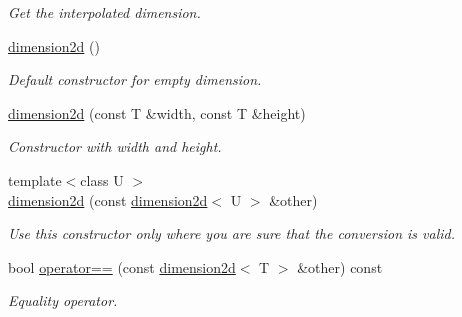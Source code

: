 \begin{DoxyCompactItemize}
\begin{DoxyCompactList}\small\item\em Get the interpolated dimension. \end{DoxyCompactList}\item 
\mbox{\label{classirr_1_1core_1_1dimension2d_ae0c2a30ce6283602c454901ef0bd6a04}} 
\hyperlink{classirr_1_1core_1_1dimension2d_ae0c2a30ce6283602c454901ef0bd6a04}{dimension2d} ()
\begin{DoxyCompactList}\small\item\em Default constructor for empty dimension. \end{DoxyCompactList}\item 
\mbox{\label{classirr_1_1core_1_1dimension2d_a9032aa6e975b32497ed3b570e3d03b76}} 
\hyperlink{classirr_1_1core_1_1dimension2d_a9032aa6e975b32497ed3b570e3d03b76}{dimension2d} (const T \&width, const T \&height)
\begin{DoxyCompactList}\small\item\em Constructor with width and height. \end{DoxyCompactList}\item 
\mbox{\label{classirr_1_1core_1_1dimension2d_a50814f5fc29d226104d5739350befb31}} 
{\footnotesize template$<$class U $>$ }\\\hyperlink{classirr_1_1core_1_1dimension2d_a50814f5fc29d226104d5739350befb31}{dimension2d} (const \hyperlink{classirr_1_1core_1_1dimension2d}{dimension2d}$<$ U $>$ \&other)
\begin{DoxyCompactList}\small\item\em Use this constructor only where you are sure that the conversion is valid. \end{DoxyCompactList}\item 
\mbox{\label{classirr_1_1core_1_1dimension2d_acb4e8b532083b57ee9849703657c7309}} 
bool \hyperlink{classirr_1_1core_1_1dimension2d_acb4e8b532083b57ee9849703657c7309}{operator==} (const \hyperlink{classirr_1_1core_1_1dimension2d}{dimension2d}$<$ T $>$ \&other) const
\begin{DoxyCompactList}\small\item\em Equality operator. \end{DoxyCompactList}\item 

\end{DoxyCompactItemize}
